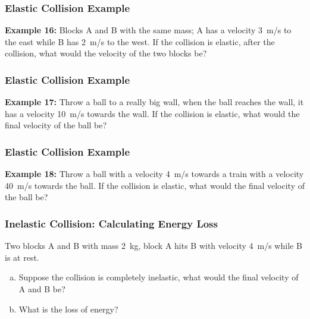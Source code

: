\documentclass[12pt,compress,aspectratio=169]{beamer}
\begin{document}
\begin{frame}
  \frametitle{Elastic Collision Example}
  \textbf{Example 16:} Blocks A and B with the same mass; A has a velocity
  \SI{3}{m/s} to the east while B has \SI{2}{m/s} to the west. If the collision
  is elastic, after the collision, what would the velocity of the two blocks be?
\end{frame}


\begin{frame}
  \frametitle{Elastic Collision Example}
  
  \textbf{Example 17:} Throw a ball to a really big wall, when the ball reaches
  the wall, it has a velocity \SI{10}{m/s} towards the wall. If the collision
  is elastic, what would the final velocity of the ball be?
\end{frame}


\begin{frame}
  \frametitle{Elastic Collision Example}
  \textbf{Example 18:} Throw a ball with a velocity \SI{4}{m/s} towards a train
  with a velocity \SI{40}{m/s} towards the ball. If the collision is elastic,
  what would the final velocity of the ball be?
\end{frame}


\begin{frame}
  \frametitle{Inelastic Collision: Calculating Energy Loss}
  Two blocks A and B with mass \SI{2}{kg}, block A hits B with velocity
  \SI{4}{m/s} while B is at rest.
  \begin{enumerate}[(a)]
  \item Suppose the collision is completely inelastic, what would the final
    velocity of A and B be?
  \item What is the loss of energy?
  \end{enumerate}
\end{frame}
\end{document}
